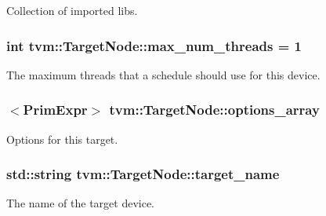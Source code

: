 Collection of imported libs. 

\subsubsection[{\texorpdfstring{max\+\_\+num\+\_\+threads}{max_num_threads}}]{\setlength{\rightskip}{0pt plus 5cm}int tvm\+::\+Target\+Node\+::max\+\_\+num\+\_\+threads = 1}\hypertarget{classtvm_1_1TargetNode_ad501b3a5f9c4af3eac8ef71b924231c6}{}\label{classtvm_1_1TargetNode_ad501b3a5f9c4af3eac8ef71b924231c6}


The maximum threads that a schedule should use for this device. 

\subsubsection[{\texorpdfstring{options\+\_\+array}{options_array}}]{$<${\bf Prim\+Expr}$>$ tvm\+::\+Target\+Node\+::options\+\_\+array}\hypertarget{classtvm_1_1TargetNode_a6957dc3edcbf686c77d10dc4ce0be572}{}\label{classtvm_1_1TargetNode_a6957dc3edcbf686c77d10dc4ce0be572}


Options for this target. 

\subsubsection[{\texorpdfstring{target\+\_\+name}{target_name}}]{\setlength{\rightskip}{0pt plus 5cm}std\+::string tvm\+::\+Target\+Node\+::target\+\_\+name}\hypertarget{classtvm_1_1TargetNode_aeafc514163bba21ce3c676edd07dd7cb}{}\label{classtvm_1_1TargetNode_aeafc514163bba21ce3c676edd07dd7cb}


The name of the target device. 

